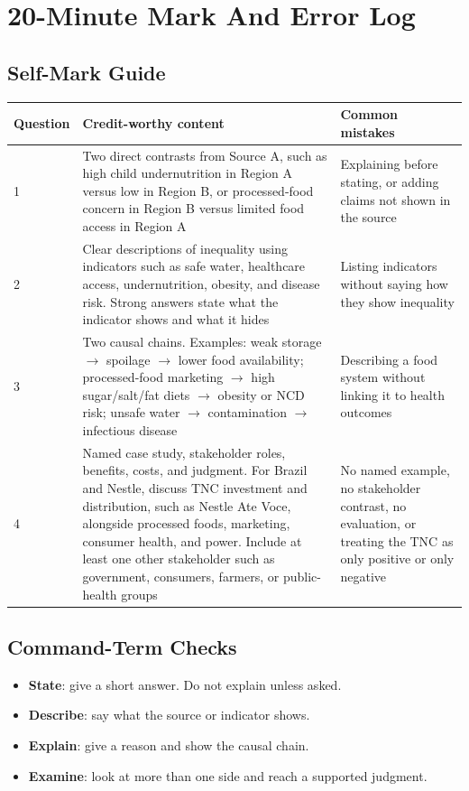 \documentclass[11pt,a4paper]{article}
\newcommand{\exam}[1]{\textcolor{AccentTeal}{\textbf{#1}}}
\begin{document}
\section{20-Minute Mark And Error Log}

\subsection{Self-Mark Guide}

\begin{tabularx}{\textwidth}{L{0.13\textwidth}Y Y}
\toprule
\textbf{Question} & \textbf{Credit-worthy content} & \textbf{Common mistakes} \\
 & Two direct contrasts from Source A, such as high child undernutrition in
Region A versus low in Region B, or processed-food concern in Region B versus
limited food access in Region A & Explaining before stating, or adding claims
not shown in the source \\
2 & Clear descriptions of inequality using indicators such as safe water,
healthcare access, undernutrition, obesity, and disease risk. Strong answers
state what the indicator shows and what it hides & Listing indicators without
saying how they show inequality \\
3 & Two causal chains. Examples: weak storage $\rightarrow$ spoilage
$\rightarrow$ lower food availability; processed-food marketing $\rightarrow$
high sugar/salt/fat diets $\rightarrow$ obesity or NCD risk; unsafe water
$\rightarrow$ contamination $\rightarrow$ infectious disease & Describing a food
system without linking it to health outcomes \\
4 & Named case study, stakeholder roles, benefits, costs, and judgment. For
Brazil and Nestle, discuss TNC investment and distribution, such as Nestle Ate
Voce, alongside processed foods, marketing, consumer health, and power. Include
at least one other stakeholder such as government, consumers, farmers, or
public-health groups &
No named example, no stakeholder contrast, no evaluation, or treating the TNC as
only positive or only negative \\
\bottomrule
\end{tabularx}

\subsection{Command-Term Checks}

\begin{itemize}
  \item \exam{State}: give a short answer. Do not explain unless asked.
  \item \exam{Describe}: say what the source or indicator shows.
  \item \exam{Explain}: give a reason and show the causal chain.
  \item \exam{Examine}: look at more than one side and reach a supported
  judgment.
\end{itemize}
\end{document}
